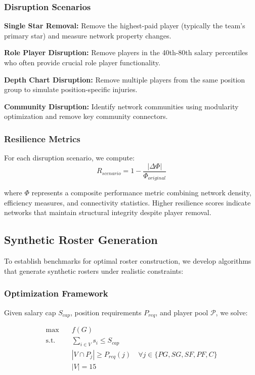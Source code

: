 \documentclass[11pt]{article}
\begin{document}
\subsubsection{Disruption Scenarios}

\textbf{Single Star Removal:} Remove the highest-paid player (typically the team's primary star) and measure network property changes.

\textbf{Role Player Disruption:} Remove players in the 40th-80th salary percentiles who often provide crucial role player functionality.

\textbf{Depth Chart Disruption:} Remove multiple players from the same position group to simulate position-specific injuries.

\textbf{Community Disruption:} Identify network communities using modularity optimization and remove key community connectors.

\subsubsection{Resilience Metrics}

For each disruption scenario, we compute:
$$R_{scenario} = 1 - \frac{|\Delta \Phi|}{\Phi_{original}}$$

where $\Phi$ represents a composite performance metric combining network density, efficiency measures, and connectivity statistics. Higher resilience scores indicate networks that maintain structural integrity despite player removal.

\subsection{Synthetic Roster Generation}

To establish benchmarks for optimal roster construction, we develop algorithms that generate synthetic rosters under realistic constraints:

\subsubsection{Optimization Framework}

Given salary cap $S_{cap}$, position requirements $P_{req}$, and player pool $\mathcal{P}$, we solve:

\begin{align}
\max & \quad f(G) \\
\text{s.t.} & \quad \sum_{i \in V} s_i \leq S_{cap} \\
& \quad |V \cap P_j| \geq P_{req}(j) \quad \forall j \in \{PG, SG, SF, PF, C\} \\
& \quad |V| = 15
\end{align}
\end{document}
